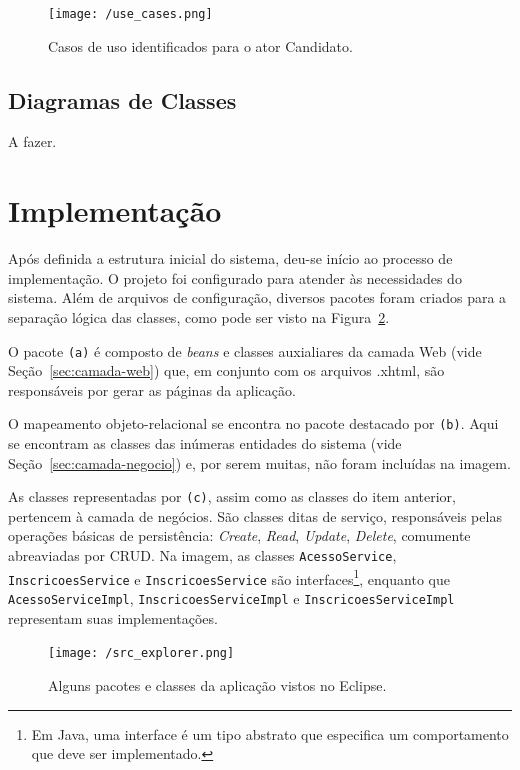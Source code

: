\documentclass[
  10.5pt,				  %
	openright,			%
	twoside,			  %
  a5paper,
  chapter=TITLE,	%
	section=TITLE,	%
  hyphens,        %
	english,        %
	brazil          %
]{abntex2}
\begin{document}
\begin{figure}[!ht]
  \caption{\label{fig:use_cases} Casos de uso identificados para o ator Candidato. }
  \begin{center}
    \texttt{[image: /use\_cases.png]}
  \end{center}
\end{figure}

\subsection{Diagramas de Classes}

A fazer.

\section{Implementação}

Após definida a estrutura inicial do sistema, deu-se início ao processo de implementação. O projeto foi configurado para atender às necessidades do sistema. Além de arquivos de configuração, diversos pacotes foram criados para a separação lógica das classes, como pode ser visto na Figura~\ref{fig:src_explorer}.

O pacote \texttt{(a)} é composto de \emph{beans} e classes auxialiares da camada Web (vide Seção~\ref{sec:camada-web}) que, em conjunto com os arquivos .xhtml, são responsáveis por gerar as páginas da aplicação.

O mapeamento objeto-relacional se encontra no pacote destacado por \texttt{(b)}. Aqui se encontram as classes das inúmeras entidades do sistema (vide Seção~\ref{sec:camada-negocio}) e, por serem muitas, não foram incluídas na imagem.

As classes representadas por \texttt{(c)}, assim como as classes do item anterior, pertencem à camada de negócios. São classes ditas de serviço, responsáveis pelas operações básicas de persistência: \emph{Create}, \emph{Read}, \emph{Update}, \emph{Delete}, comumente abreaviadas por CRUD. Na imagem, as classes \texttt{AcessoService}, \texttt{InscricoesService} e \texttt{InscricoesService} são interfaces\footnote{Em Java, uma interface é um tipo abstrato que especifica um comportamento que deve ser implementado.}, enquanto que \texttt{AcessoServiceImpl}, \texttt{InscricoesServiceImpl} e \texttt{InscricoesServiceImpl} representam suas implementações.

\begin{figure}[!ht]
  \caption{\label{fig:src_explorer} Alguns pacotes e classes da aplicação vistos no Eclipse. }
  \begin{center}
    \texttt{[image: /src\_explorer.png]}
  \end{center}
\end{figure}
\end{document}
